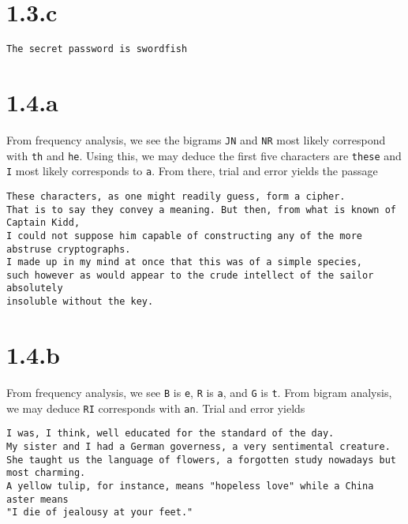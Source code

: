 \documentclass{article}
\newenvironment{myindentpar}[1]
  {\begin{list}{}
          {\setlength{\leftmargin}{#1}}
          \item[]
  }
  {\end{list}}
\begin{document}
\section*{1.3.c}
\verb|The secret password is swordfish|

\section*{1.4.a}
From frequency analysis, we see the bigrams \verb|JN| and \verb|NR| most likely correspond with \verb|th| and \verb|he|. Using this, we may deduce the first five characters are \verb|these| and \verb|I| most likely corresponds to \verb|a|. From there, trial and error yields the passage
\begin{myindentpar}{1em}
\verb|These characters, as one might readily guess, form a cipher.|\\
\verb|That is to say they convey a meaning. But then, from what is known of Captain Kidd,|\\
\verb|I could not suppose him capable of constructing any of the more abstruse cryptographs.|\\
\verb|I made up in my mind at once that this was of a simple species,|\\
\verb|such however as would appear to the crude intellect of the sailor absolutely|\\
\verb|insoluble without the key.|
\end{myindentpar}

\section*{1.4.b}
From frequency analysis, we see \verb|B| is \verb|e|, \verb|R| is \verb|a|, and \verb|G| is \verb|t|. From bigram analysis, we may deduce \verb|RI| corresponds with \verb|an|. Trial and error yields
\begin{myindentpar}{1em}
\verb|I was, I think, well educated for the standard of the day.|\\
\verb|My sister and I had a German governess, a very sentimental creature.|\\
\verb|She taught us the language of flowers, a forgotten study nowadays but most charming.|\\
\verb|A yellow tulip, for instance, means "hopeless love" while a China aster means|\\
\verb|"I die of jealousy at your feet."|
\end{myindentpar}
\end{document}
